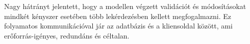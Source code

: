 Nagy hátrányt jelentett, hogy a modellen végzett validációt és módosításokat mindkét kényszer esetében több lekérdezésben kellett megfogalmazni. Ez folyamatos kommunikációval jár az adatbázis és a kliensoldal között, ami erőforrás-igényes, redundáns és céltalan.

%